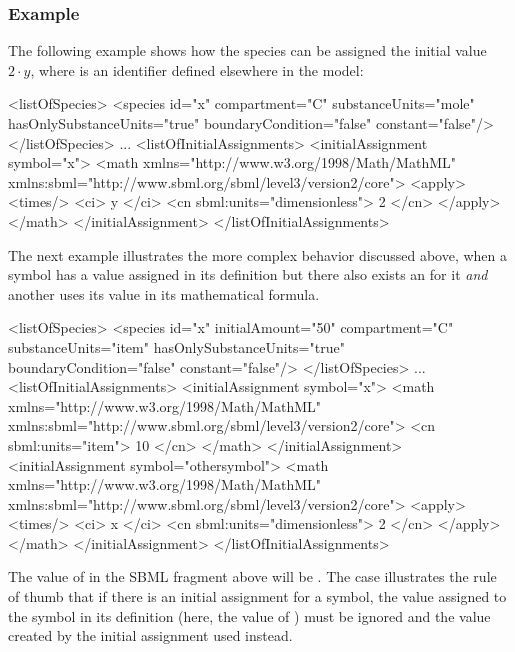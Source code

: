 \subsubsection{Example}

The following example shows how the species  can be
assigned the initial value $2 \cdot y$, where  is an
identifier defined elsewhere in the model:

\begin{example}
<listOfSpecies>
    <species id="x" compartment="C" substanceUnits="mole"
             hasOnlySubstanceUnits="true" boundaryCondition="false" constant="false"/>
</listOfSpecies>
...
<listOfInitialAssignments>
    <initialAssignment symbol="x">
        <math xmlns="http://www.w3.org/1998/Math/MathML"
              xmlns:sbml="http://www.sbml.org/sbml/level3/version2/core">
            <apply>
                <times/> 
                <ci> y </ci> 
                <cn sbml:units="dimensionless"> 2 </cn>
            </apply>
        </math>
    </initialAssignment>
</listOfInitialAssignments>
\end{example}

The next example illustrates the more complex behavior discussed
above, when a symbol has a value assigned in its definition but
there also exists an \InitialAssignment for it \emph{and} another
\InitialAssignment uses its value in its mathematical formula.

\begin{example}
<listOfSpecies>
    <species id="x" initialAmount="50" compartment="C" substanceUnits="item"
             hasOnlySubstanceUnits="true" boundaryCondition="false" constant="false"/>
</listOfSpecies>
...
<listOfInitialAssignments>
    <initialAssignment symbol="x">
        <math xmlns="http://www.w3.org/1998/Math/MathML"
              xmlns:sbml="http://www.sbml.org/sbml/level3/version2/core">
            <cn sbml:units="item"> 10 </cn>
        </math>
    </initialAssignment>
    <initialAssignment symbol="othersymbol">
        <math xmlns="http://www.w3.org/1998/Math/MathML"
              xmlns:sbml="http://www.sbml.org/sbml/level3/version2/core">
            <apply>
                <times/>
                <ci> x </ci>
                <cn sbml:units="dimensionless"> 2 </cn>
            </apply>
        </math>
    </initialAssignment>
</listOfInitialAssignments>
\end{example}

The value of  in the SBML fragment above will be
.  The case illustrates the rule of thumb that if there is
an initial assignment for a symbol, the value assigned to the
symbol in its definition (here, the value of
) must be ignored and the value created by
the initial assignment used instead.


